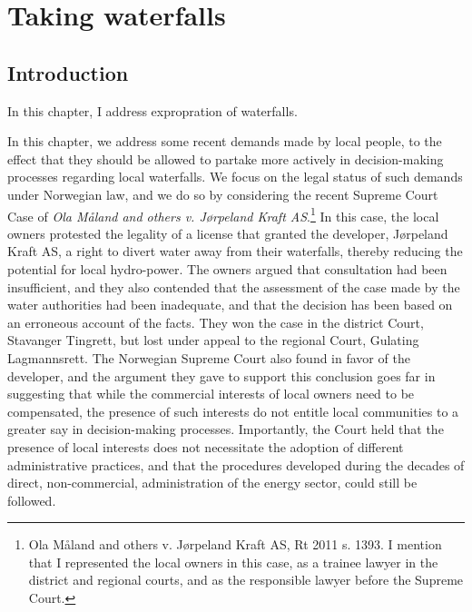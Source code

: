 \chapter{Taking waterfalls}\label{chap:4}

\section{Introduction}\label{sec:intro4}

In this chapter, I address expropration of waterfalls. 

In this chapter, we address some recent demands made by local people, to the effect that they should be allowed to partake more actively in decision-making processes regarding local waterfalls. We focus on the legal status of such demands under Norwegian law, and we do so by considering the recent Supreme Court Case of \emph{Ola Måland and others v. Jørpeland Kraft AS}.\footnote{Ola M{\aa}land and others v. J{\o}rpeland Kraft AS, Rt 2011 s. 1393. I mention that I represented the local owners in this case, as a trainee lawyer in the district and regional courts, and as the responsible lawyer before the Supreme Court.} In this case, the local owners protested the legality of a license that granted the developer, Jørpeland Kraft AS, a right to divert water away from their waterfalls, thereby reducing the potential for local hydro-power. The owners argued that consultation had been insufficient, and they also contended that the assessment of the case made by the water authorities had been inadequate, and that the decision has been based on an erroneous account of the facts. They won the case in the district Court, Stavanger Tingrett, but lost under appeal to the regional Court, Gulating Lagmannsrett. The Norwegian Supreme Court also found in favor of the developer, and the argument they gave to support this conclusion goes far in suggesting that while the commercial interests of local owners need to be compensated, the presence of such interests do not entitle local communities to a greater say in decision-making processes. Importantly, the Court held that the presence of local interests does not necessitate the adoption of different administrative practices, and that the procedures developed during the decades of direct, non-commercial, administration of the energy sector, could still be followed.

